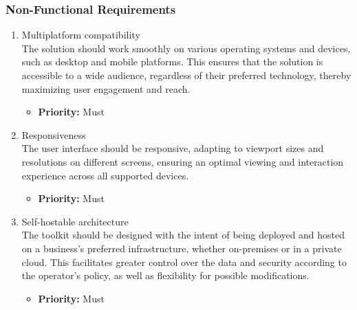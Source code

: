 \subsubsection{Non-Functional Requirements}

\begin{enumerate}[label=\textbf{NF\arabic*:}, leftmargin=*]

\item \label{itm:NF1} Multiplatform compatibility
\vspace{2pt}
\\The solution should work smoothly on various operating systems and devices, such as desktop and mobile platforms. This ensures that the solution is accessible to a wide audience, regardless of their preferred technology, thereby maximizing user engagement and reach.
\begin{itemize}[noitemsep, label=\trianglebullet]
    \item \textbf{Priority:} Must
\end{itemize}
\vspace{4pt}

\item \label{itm:NF2} Responsiveness
\vspace{2pt}
\\The user interface should be responsive, adapting to viewport sizes and resolutions on different screens, ensuring an optimal viewing and interaction experience across all supported devices.
\begin{itemize}[noitemsep, label=\trianglebullet]
    \item \textbf{Priority:} Must
\end{itemize}
\vspace{4pt}

\item \label{itm:NF3} Self-hostable architecture
\vspace{2pt}
\\The toolkit should be designed with the intent of being deployed and hosted on a business's preferred infrastructure, whether on-premises or in a private cloud. This facilitates greater control over the data and security according to the operator's policy, as well as flexibility for \phantom{possible modifications.}\newpage possible modifications.
\begin{itemize}[noitemsep, label=\trianglebullet]
    \item \textbf{Priority:} Must
\end{itemize}
\vspace{4pt}


\end{enumerate}
